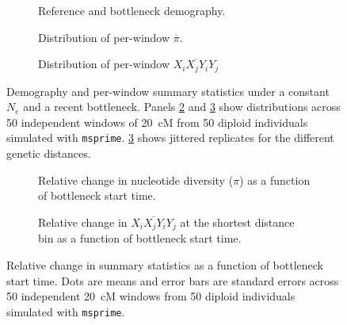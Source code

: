 \documentclass[12pt]{article}
\begin{document}
\begin{figure}[h]
	\centering
	\begin{subfigure}[t]{0.32\textwidth}
		\centering
		\resizebox{\linewidth}{!}{}
		\caption{Reference and bottleneck demography.}
		\label{fig:conceptual:demography}
	\end{subfigure}
	\hfill
	\begin{subfigure}[t]{0.32\textwidth}
		\centering
		\resizebox{\linewidth}{!}{}
		\caption{Distribution of per-window $\overline{\pi}$.}
		\label{fig:conceptual:pi_hist}
	\end{subfigure}
	\hfill
	\begin{subfigure}[t]{0.32\textwidth}
		\centering
		\resizebox{\linewidth}{!}{}
		\caption{Distribution of per-window $\overline{X_iX_jY_iY_j}$}
		\label{fig:conceptual:ld}
	\end{subfigure}
	\caption{Demography and per-window summary statistics under a constant $N_e$ and a recent bottleneck. Panels \ref{fig:conceptual:pi_hist} and \ref{fig:conceptual:ld} show distributions across 50 independent windows of 20~cM from 50 diploid individuals simulated with \texttt{msprime}. \ref{fig:conceptual:ld} shows jittered replicates for the different genetic distances. }
	\label{fig:conceptual}
\end{figure}

\begin{figure}[h]
	\centering
	\begin{subfigure}[t]{0.48\textwidth}
		\centering
		\resizebox{\linewidth}{!}{}
		\caption{Relative change in nucleotide diversity ($\pi$) as a function of bottleneck start time.}
		\label{fig:conceptual:pi_change}
	\end{subfigure}
	\hfill
	\begin{subfigure}[t]{0.48\textwidth}
		\centering
		\resizebox{\linewidth}{!}{}
		\caption{Relative change in $\overline{X_iX_jY_iY_j}$ at the shortest distance bin as a function of bottleneck start time.}
		\label{fig:conceptual:ld_change}
	\end{subfigure}
	\caption{Relative change in summary statistics as a function of bottleneck start time. Dots are means and error bars are standard errors across 50 independent 20~cM windows from 50 diploid individuals simulated with \texttt{msprime}.}
	\label{fig:conceptual_change}
\end{figure}
\end{document}

